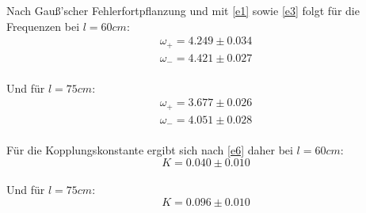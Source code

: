 Nach Gauß'scher Fehlerfortpflanzung und mit \eqref{e1} sowie \eqref{e3} folgt für die Frequenzen bei $l = 60cm$:
\begin{equation*}
\begin{split}
  \omega_+ = 4.249 \pm 0.034 \\
  \omega_- = 4.421 \pm 0.027
\end{split}
\end{equation*}
\\
Und für $l = 75cm$:
\begin{equation*}
\begin{split}
  \omega_+ = 3.677 \pm 0.026 \\
  \omega_- = 4.051 \pm 0.028
\end{split}
\end{equation*}
\\
Für die Kopplungskonstante ergibt sich nach \eqref{e6} daher bei $l = 60cm$:
\begin{equation*}
  K = 0.040 \pm 0.010
\end{equation*}
\\
Und für $l = 75cm$:
\begin{equation*}
  K = 0.096 \pm 0.010
\end{equation*}
\\
